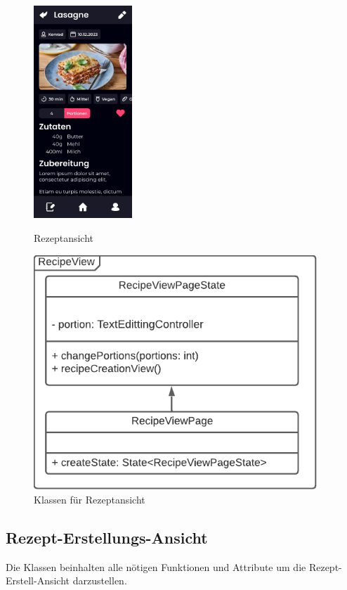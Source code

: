 \documentclass{entwurfsheft}
\begin{document}
    \begin{figure}[htp]
        \begin{minipage}
            [t]{0.49\textwidth}
            \centering
            \includegraphics[height=80mm]{images/Presentation-layer/RecipeView.jpg}
            \caption{Rezeptansicht}
        \end{minipage}
        \begin{minipage}
            [t]{0.49\textwidth}
            \centering
            \includegraphics[width=0.95\textwidth]{images/Presentation-layer/RecipeViewClass.pdf}
            \caption{Klassen für Rezeptansicht}
        \end{minipage}
    \end{figure} 

    \newpage

\subsection{Rezept-Erstellungs-Ansicht}
    Die Klassen beinhalten alle nötigen Funktionen und Attribute um die Rezept-Erstell-Ansicht darzustellen.
\end{document}
